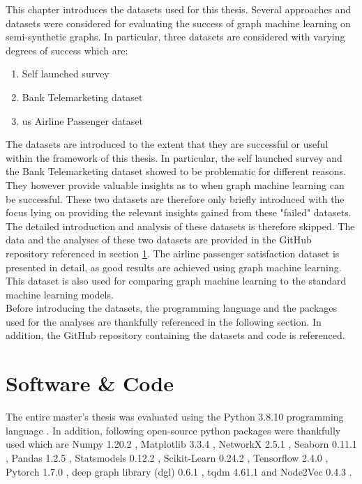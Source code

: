   
  This chapter introduces the datasets used for this thesis. Several approaches
  and datasets were considered for evaluating the success of graph machine
  learning on semi-synthetic graphs. In particular, three datasets are 
  considered with varying degrees of success which are:

  \begin{enumerate}
    \item Self launched survey
    \item Bank Telemarketing dataset
    \item \acs{us} Airline Passenger dataset
  \end{enumerate}

  \noindent The datasets are introduced to the extent that they are successful 
  or useful within the framework of this thesis. In particular, the self 
  launched survey and the Bank Telemarketing dataset showed to be problematic 
  for different reasons. They however provide valuable insights as to when 
  graph machine learning can be successful. These two datasets are therefore 
  only briefly introduced with the focus lying on providing the relevant 
  insights gained from these "failed" datasets. The detailed introduction and
  analysis of these datasets is therefore skipped. The data and the analyses of
  these two datasets are provided in the GitHub repository referenced in
  section \ref{section:software}. The airline passenger satisfaction dataset 
  is presented in detail, as good results are achieved using graph machine 
  learning. This dataset is also used for comparing graph machine learning 
  to the standard machine learning models. \\

  \noindent Before introducing the datasets, the programming language and the
   packages used for the analyses are thankfully referenced in the following 
   section. In addition, the GitHub repository containing the datasets and code
   is referenced.

  \section{Software \& Code}
  \label{section:software}

  The entire master's thesis was evaluated using the Python 3.8.10 programming
  language \citep{vanRossum2009}. In addition, following open-source python
  packages were thankfully used which are Numpy 1.20.2 \citep{harris2020array},
  Matplotlib 3.3.4 \citep{Hunter2007}, NetworkX 2.5.1 \citep{hagberg2008exploring}, 
  Seaborn 0.11.1 \citep{Waskom2021}, Pandas 1.2.5 \citep{mckinney2010data}, 
  Statsmodels 0.12.2 \citep{seabold2010statsmodels}, Scikit-Learn 0.24.2 
  \citep{pedregosa2011scikit}, Tensorflow 2.4.0 \citep{abadi2016tensorflow}, 
  Pytorch 1.7.0 \citep{paszke2019pytorch}, deep graph library (dgl) 0.6.1 
  \citep{wang2019deep}, tqdm 4.61.1 \citep{da2021tqdm} and Node2Vec 0.4.3 
  \citep{Cohen2021}. \\


